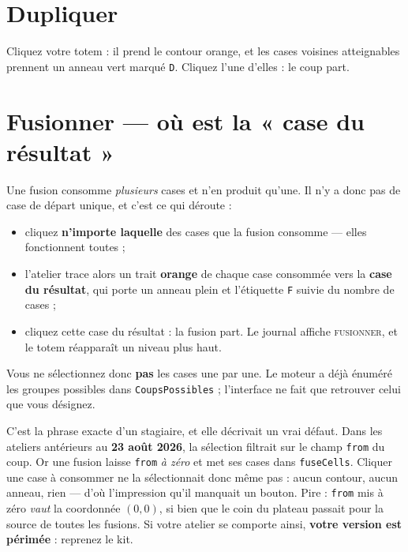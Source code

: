\section{Dupliquer}

Cliquez votre totem : il prend le contour orange, et les cases voisines
atteignables prennent un anneau vert marqué \texttt{D}. Cliquez l'une d'elles :
le coup part.

\section{Fusionner --- où est la « case du résultat »}

Une fusion consomme \emph{plusieurs} cases et n'en produit qu'une. Il n'y a donc
pas de case de départ unique, et c'est ce qui déroute :

\begin{itemize}
  \item cliquez \textbf{n'importe laquelle} des cases que la fusion consomme ---
        elles fonctionnent toutes ;
  \item l'atelier trace alors un trait \textbf{orange} de chaque case consommée
        vers la \textbf{case du résultat}, qui porte un anneau plein et
        l'étiquette \texttt{F} suivie du nombre de cases ;
  \item cliquez cette case du résultat : la fusion part. Le journal affiche
        \textsc{fusionner}, et le totem réapparaît un niveau plus haut.
\end{itemize}

Vous ne sélectionnez donc \textbf{pas} les cases une par une. Le moteur a déjà
énuméré les groupes possibles dans \texttt{CoupsPossibles} ; l'interface ne fait
que retrouver celui que vous désignez.

\begin{nkpiege}
C'est la phrase exacte d'un stagiaire, et elle décrivait un vrai défaut. Dans
les ateliers antérieurs au \textbf{23 août 2026}, la sélection filtrait sur le
champ \texttt{from} du coup. Or une fusion laisse \texttt{from} \emph{à zéro} et
met ses cases dans \texttt{fuseCells}. Cliquer une case à consommer ne la
sélectionnait donc même pas : aucun contour, aucun anneau, rien --- d'où
l'impression qu'il manquait un bouton. Pire : \texttt{from} mis à zéro
\emph{vaut} la coordonnée $(0,0)$, si bien que le coin du plateau passait pour
la source de toutes les fusions. Si votre atelier se comporte ainsi,
\textbf{votre version est périmée} : reprenez le kit.
\end{nkpiege}

